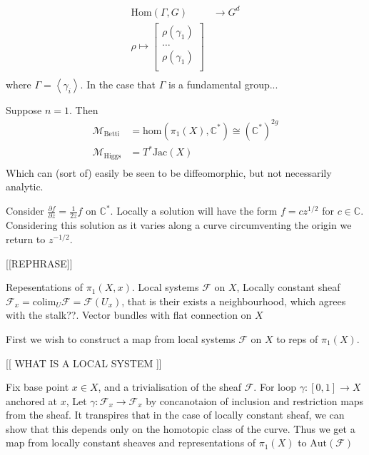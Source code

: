 \begin{align}
    \mathrm{Hom}(\Gamma, G) & \rightarrow  G^d \\
    \rho \mapsto \left[ \begin{array}{r}
        \rho(\gamma_1)\\ 
        \dots \\
        \rho(\gamma_1)\\ 
    \end{array} \right]  \\
\end{align}
where $ \Gamma  = \left< \gamma_i \right> $. 
In the case that $ \Gamma$ is a fundamental group...

Suppose $n=1$. 
Then 
\begin{align}
    \mathcal{M}_{\mathrm{Betti}} & = \mathrm{hom} ( \pi_1 (X) , \mathbb{C} ^* ) \cong (\mathbb{C} ^*)^{2g} \\
    \mathcal{M}_{\mathrm{Higgs}} & = T^* \mathrm{Jac} ( X) \\
\end{align}
Which can (sort of) easily be seen to be diffeomorphic, but not necessarily analytic. 

Consider $ \frac{\partial f }{ \partial z } = \frac{1}{2z} f $ on $ \mathbb{C} ^* $.
Locally a solution will have the form $ f = c z^{1/2} $ for $c \in \mathbb{C} $. 
Considering this solution as it varies along a curve circumventing the origin we return to $z ^{-1/2} $.

[[REPHRASE]] 

Repesentations of $\pi_1 (X,x) $. 
Local systems $\mathcal{F} $ on $X$,
Locally constant sheaf $ \mathcal{F}_x  = \mathrm{colim} _{U} \mathcal{F} = \mathcal{F}(U_x) $, 
that is their exists a neighbourhood, which agrees with the stalk??.
Vector bundles with flat connection on $X$ 

First we wish to construct a map from local systems $\mathcal{F}$ on $X $ to reps of $\pi_1(X)$. 

[[ WHAT IS A LOCAL SYSTEM ]] 

Fix base point $x \in X$, and a trivialisation of the sheaf $\mathcal{F}$. 
For loop $ \gamma: [0,1] \rightarrow  X$ anchored at $x$, 
Let $ \gamma: \mathcal{F}_x \rightarrow  \mathcal{F}_x $ by concanotaion of inclusion and restriction maps from the sheaf.  
It transpires that in the case of locally constant sheaf, we can show that this depends only on the homotopic class of the curve. 
Thus we get a map from locally constant sheaves and representations of $\pi_1(X) $ to $\mathrm{Aut}(\mathcal{F} ) $ 

